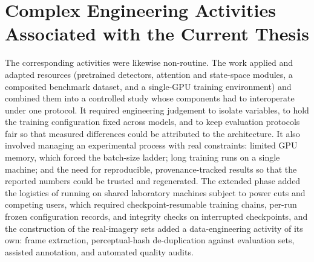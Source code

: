 \section{Complex Engineering Activities Associated with the Current Thesis}
The corresponding activities were likewise non-routine. The work applied and
adapted resources (pretrained detectors, attention and state-space modules, a
composited benchmark dataset, and a single-GPU training environment) and
combined them into a controlled study whose components had to interoperate under
one protocol. It required engineering judgement to isolate variables, to hold the
training configuration fixed across models, and to keep evaluation protocols fair
so that measured differences could be attributed to the architecture. It also
involved managing an experimental process with real constraints: limited GPU
memory, which forced the batch-size ladder; long training runs on a single machine;
and the need for reproducible, provenance-tracked results so that the reported
numbers could be trusted and regenerated. The extended phase added the logistics
of running on shared laboratory machines subject to power cuts and competing
users, which required checkpoint-resumable training chains, per-run frozen
configuration records, and integrity checks on interrupted checkpoints, and the
construction of the real-imagery sets added a data-engineering activity of its
own: frame extraction, perceptual-hash de-duplication against evaluation sets,
assisted annotation, and automated quality audits.
